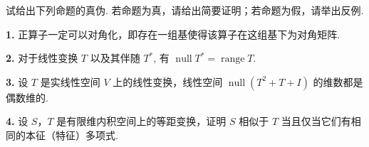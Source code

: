 \documentclass[UTF8,14pt,normal]{ctexart}
\begin{document}
 试给出下列命题的真伪. 若命题为真，请给出简要证明；若命题为假，请举出反例.

\textbf{1.} 正算子一定可以对角化，即存在一组基使得该算子在这组基下为对角矩阵.

\textbf{2.} 对于线性变换 $T$ 以及其伴随 $T^*$, 有 $\operatorname{null}T^*=\operatorname{range}T$.

\textbf{3.} 设 $T$ 是实线性空间 $V$ 上的线性变换，线性空间 $\operatorname{null}(T^2+T+I)$ 的维数都是偶数维的.

\textbf{4.} 设 $S$，$T$ 是有限维内积空间上的等距变换，证明 $S$ 相似于 $T$ 当且仅当它们有相同的本征（特征）多项式.
\end{document}
